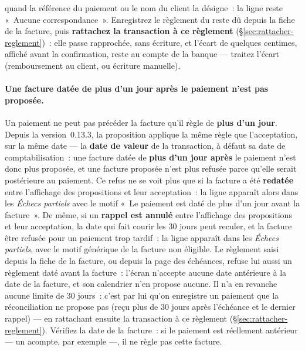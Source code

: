 \documentclass[a4paper,11pt,oneside]{article}
\begin{document}
quand la référence du paiement ou le nom du client la désigne~: la ligne reste «~Aucune correspondance~». Enregistrez le règlement du reste dû depuis la fiche de la facture, puis \textbf{rattachez la transaction à ce règlement} (\S\ref{sec:rattacher-reglement})~: elle passe rapprochée, sans écriture, et l'écart de quelques centimes, affiché avant la confirmation, reste au compte de la banque --- traitez l'écart (remboursement au client, ou écriture manuelle).

\paragraph{Une facture datée de plus d'un jour après le paiement n'est pas proposée.}\label{sec:facture-posterieure} Un paiement ne peut pas précéder la facture qu'il règle de \textbf{plus d'un jour}. Depuis la version~0.13.3, la proposition applique la même règle que l'acceptation, sur la même date --- la \textbf{date de valeur} de la transaction, à défaut sa date de comptabilisation~: une facture datée de \textbf{plus d'un jour après} le paiement n'est donc plus proposée, et une facture proposée n'est plus refusée parce qu'elle serait postérieure au paiement. Ce refus ne se voit plus que si la facture a été \textbf{redatée} entre l'affichage des propositions et leur acceptation~: la ligne apparaît alors dans les \emph{Échecs partiels} avec le motif «~Le paiement est daté de plus d'un jour avant la facture~». De même, si un \textbf{rappel est annulé} entre l'affichage des propositions et leur acceptation, la date qui fait courir les 30 jours peut reculer, et la facture être refusée pour un paiement trop tardif~: la ligne apparaît dans les \emph{Échecs partiels}, avec le motif générique de la facture non éligible. Le règlement saisi depuis la fiche de la facture, ou depuis la page des échéances, refuse lui aussi un règlement daté avant la facture~: l'écran n'accepte aucune date antérieure à la date de la facture, et son calendrier n'en propose aucune. Il n'a en revanche aucune limite de 30 jours~: c'est par lui qu'on enregistre un paiement que la réconciliation ne propose pas (reçu plus de 30 jours après l'échéance et le dernier rappel) --- en rattachant ensuite la transaction à ce règlement (\S\ref{sec:rattacher-reglement}). Vérifiez la date de la facture~: si le paiement est réellement antérieur --- un acompte, par exemple ---, il ne règle pas cette facture.
\end{document}
